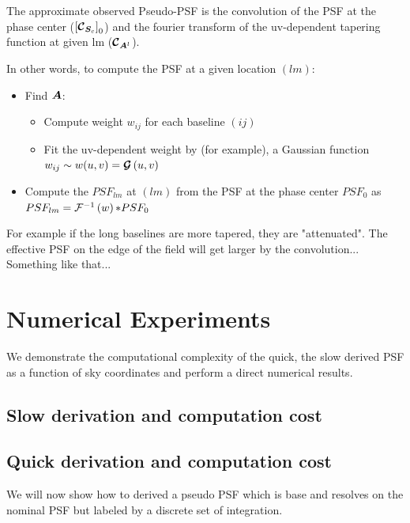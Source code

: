 The approximate observed Pseudo-PSF is the convolution of the PSF at
the phase center ($\left[\bm{\mathcal{C}}_{\bm{S}_{c}}\right]_0$) and the fourier transform of the uv-dependent tapering function at given
lm ($\bm{\mathcal{C}}_{\bm{A}^l}$).

In other words, to compute the PSF at a given location $(lm)$:

\begin{itemize}
  \item Find $\bm{A}$:
    \begin{itemize}
    \item Compute weight $w_{ij}$ for each baseline $(ij)$
    \item Fit the uv-dependent weight by (for example), a Gaussian function $w_{ij}\sim w(u,v)=\bm{\mathcal{G}}\left(u,v\right)$ 
    \end{itemize}
  \item Compute the $PSF_{lm}$ at $(lm)$ from the PSF at the phase center $PSF_0$ as $PSF_{lm}=\mathcal{F}^{-1}\left(w\right)\mathcal{*} PSF_0$
\end{itemize}
For example if the long baselines are more tapered, they are
"attenuated". The effective PSF on the edge of the field will get
larger by the convolution...
Something like that...
\section{Numerical Experiments}
We demonstrate the computational complexity of the quick, the slow derived PSF as a function of sky coordinates and 
perform a direct numerical results.
\subsection{Slow derivation and computation cost}
\subsection{Quick derivation and computation cost}
We will now show how to derived a pseudo PSF  which is base and resolves on the nominal PSF
but labeled by a discrete set of integration.
